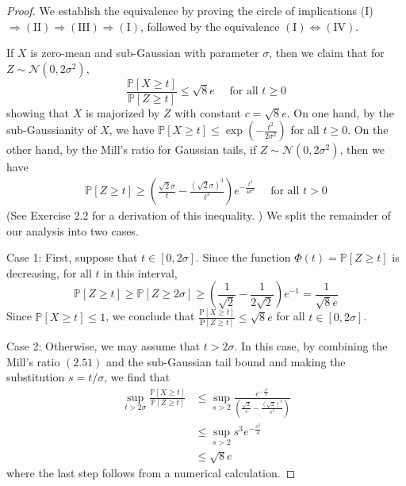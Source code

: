 \documentclass{article}
\begin{document}
\begin{proof}
We establish the equivalence by proving the circle of implications (I) $\Rightarrow(\mathrm{II}) \Rightarrow(\mathrm{III}) \Rightarrow(\mathrm{I})$, followed by the equivalence $(\mathrm{I}) \Longleftrightarrow(\mathrm{IV})$.

 If $X$ is zero-mean and sub-Gaussian with parameter $\sigma$, then we claim that for $Z \sim \mathcal{N}\left(0,2 \sigma^{2}\right)$,
$$
\frac{\mathbb{P}[X \geq t]}{\mathbb{P}[Z \geq t]} \leq \sqrt{8} e \quad \text { for all } t \geq 0
$$
showing that $X$ is majorized by $Z$ with constant $c=\sqrt{8} e$. On one hand, by the sub-Gaussianity of $X$, we have $\mathbb{P}[X \geq t] \leq \exp \left(-\frac{t^{2}}{2 \sigma^{2}}\right)$ for all $t \geq 0$. On the other hand, by the Mill's ratio for Gaussian tails, if $Z \sim \mathcal{N}\left(0,2 \sigma^{2}\right)$, then we have
\begin{align}
  \mathbb{P}[Z \geq t] \geq\left(\frac{\sqrt{2} \sigma}{t}-\frac{(\sqrt{2} \sigma)^{3}}{t^{3}}\right) e^{-\frac{t^{2}}{4 \sigma^{2}}} \quad \text { for all } t>0  \label{eq:domgau}
\end{align}
(See Exercise $2.2$ for a derivation of this inequality. ) We split the remainder of our analysis into two cases.

Case 1: First, suppose that $t \in[0,2 \sigma]$. Since the function $\Phi(t)=\mathbb{P}[Z \geq t]$ is decreasing, for all $t$ in this interval,
$$
\mathbb{P}[Z \geq t] \geq \mathbb{P}[Z \geq 2 \sigma] \geq\left(\frac{1}{\sqrt{2}}-\frac{1}{2 \sqrt{2}}\right) e^{-1}=\frac{1}{\sqrt{8} e}
$$
Since $\mathbb{P}[X \geq t] \leq 1$, we conclude that $\frac{\mathrm{P}[X \geq t]}{\mathrm{P}[Z \geq t]} \leq \sqrt{8} e$ for all $t \in[0,2 \sigma]$.

Case 2: Otherwise, we may assume that $t>2 \sigma .$ In this case, by combining the Mill's ratio $(2.51)$ and the sub-Gaussian tail bound and making the substitution $s=t / \sigma$, we find that
$$
\begin{aligned}
\sup _{t>2 \sigma} \frac{\mathbb{P}[X \geq t]}{\mathbb{P}[Z \geq t]} & \leq \sup _{s>2} \frac{e^{-\frac{s^{2}}{4}}}{\left(\frac{\sqrt{2}}{s}-\frac{(\sqrt{2})^{3}}{s^{3}}\right)} \\
& \leq \sup _{s>2} s^{3} e^{-\frac{s^{2}}{4}} \\
& \leq \sqrt{8} e
\end{aligned}
$$
where the last step follows from a numerical calculation.


\end{proof}
\end{document}
